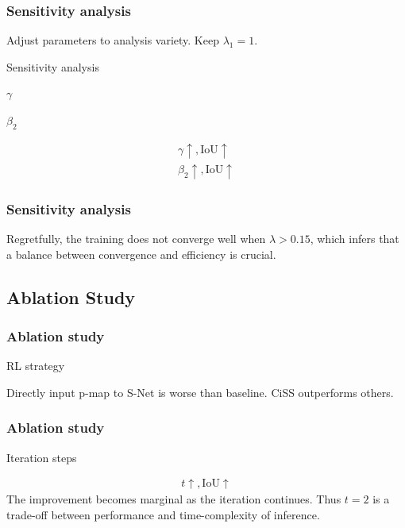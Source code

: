 \documentclass[12pt, aspectratio = 169, xcolor = x11names]{beamer}
\begin{document}
\begin{frame}
  \frametitle{Sensitivity analysis}
  Adjust parameters to analysis variety. Keep $\lambda_1 = 1$.
  \begin{table}[htbp]
    \centering
    \caption{Sensitivity analysis}%
    \label{tab:sensitivity_analysis}
    \begin{subtable}[htbp]{0.45\linewidth}
      \centering
      \caption{$\gamma$}%
      \label{tab:gamma}
      \tiny
    \end{subtable}
    \quad
    \begin{subtable}[htbp]{0.45\linewidth}
      \centering
      \caption{$\beta_2$}%
      \label{tab:beta}
      \tiny
    \end{subtable}
  \end{table}
  \pause%
  \begin{align*}
    \gamma \uparrow, \mathrm{IoU} \uparrow\\
    \beta_2 \uparrow, \mathrm{IoU} \uparrow
  \end{align*}
\end{frame}

\begin{frame}
  \frametitle{Sensitivity analysis}
  Regretfully, the training does not converge well when $\lambda > 0.15$,
  which infers that a balance between convergence and efficiency is crucial.
\end{frame}

\subsection{Ablation Study}%
\label{sub:ablation_study}

\begin{frame}
  \frametitle{Ablation study}
  \begin{table}[htbp]
    \centering
    \caption{RL strategy}%
    \label{tab:rl_strategy}
    \tiny
  \end{table}
  Directly input p-map to S-Net is worse than baseline.
  CiSS outperforms others.
\end{frame}

\begin{frame}
  \frametitle{Ablation study}
  \begin{table}[htbp]
    \centering
    \caption{Iteration steps}%
    \label{tab:iteration_steps}
    \tiny
  \end{table}
  \begin{align*}
    t \uparrow, \mathrm{IoU} \uparrow
  \end{align*}
  The improvement becomes marginal as the iteration continues.
  Thus $t = 2$ is a trade-off between performance and time-complexity of
  inference.
\end{frame}
\end{document}

